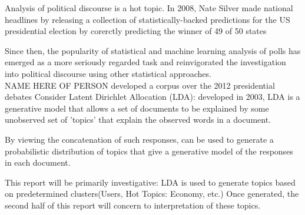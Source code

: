 Analysis of political discourse is a hot topic. In 2008, Nate Silver made national headlines by releasing a collection of statistically-backed predictions for the US presidential election by corerctly predicting the winner of 49 of 50 states \cite{Silver} 

Since then, the popularity of statistical and machine learning analysis of polls has emerged as a more seriously regarded task and reinvigorated the investigation into political discourse using other statistical approaches.\\

NAME HERE OF PERSON developed a corpus over the 2012 presidential debates\cite{PERSON}
Consider Latent Dirichlet Allocation (LDA): developed in 2003, LDA is a generative model that allows a set of documents to be explained by some unobserved set of 'topics' that explain the observed words in a document.

By viewing the concatenation of such responses, can be used to generate a probabilistic distribution of topics that give a generative model of the responses in each document.

This report will be primarily investigative: LDA is used to generate topics based on predetermined clusters(Users, Hot Topics: Economy, etc.) Once generated, the second half of this report will concern to interpretation of these topics.